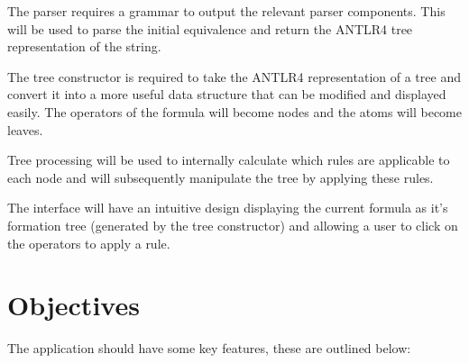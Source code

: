 \documentclass{report}
\begin{document}
The parser requires a grammar to output the relevant parser components. This will be used to parse the initial equivalence and return the ANTLR4 tree representation of the string.

The tree constructor is required to take the ANTLR4 representation of a tree and convert it into a more useful data structure that can be modified and displayed easily. The operators of the formula will become nodes and the atoms will become leaves.

Tree processing will be used to internally calculate which rules are applicable to each node and will subsequently manipulate the tree by applying these rules.

The interface will have an intuitive design displaying the current formula as it's formation tree (generated by the tree constructor) and allowing a user to click on the operators to apply a rule.

\section{Objectives}

The application should have some key features, these are outlined below:
\end{document}
